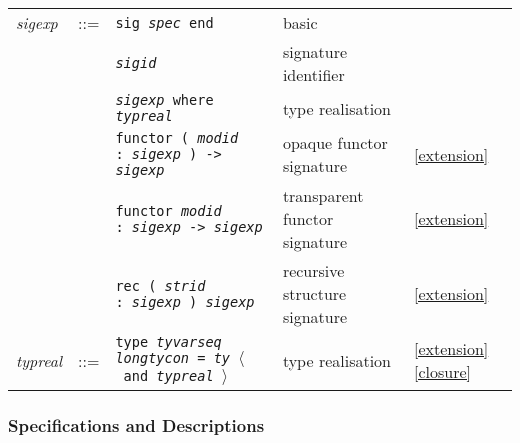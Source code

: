 \documentclass[fleqn,a4paper]{article}
\newcounter{extension}
\newcommand{\x}[1][]{\ref{extension}{#1}}
\newcommand{\la}{$\langle$}
\newcommand{\ra}{$\rangle$}
\begin{document}
\begin{tabular}{@{}lllll}
{\it sigexp\/} & ::= & {\tt sig {\it spec\/} end}& basic\\
& & {\tt {\it sigid\/}} & signature identifier \\ 
& & {\tt {\it sigexp\/} where  {\it typreal\/}}& type realisation \\ 
& & {\tt functor ( {\it modid\/} :\ {\it sigexp} ) -> {\it sigexp}}  & opaque functor signature & \x \\
& & {\tt functor {\it modid\/} :\ {\it sigexp\/} -> {\it sigexp}}  & transparent functor signature & \x \\
& & {\tt rec ( {\it strid\/} :\ {\it sigexp} ) {\it sigexp}}  & recursive structure signature & \x \\[2ex]

{\it typreal\/} & ::= & {\tt type {\it tyvarseq\/} {\it longtycon\/} = {\it ty\/}
\la\ and {\it typreal\/} \ra}  & type realisation & \x[\ref{closure}]
\end{tabular}

\subsubsection*{Specifications and Descriptions}
\end{document}
